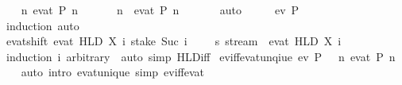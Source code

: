 \begin{isabellebody}
\isamarkupfalse%
\isanewline
\ \ \isamarkupfalse%
\ {\isachardoublequoteopen}{\isasymexists}n{\isachardot}\ ev{\isacharunderscore}at\ P\ n\ {\isasymomega}{\isachardoublequoteclose}\isanewline
\ \ \isamarkupfalse%
\ \isamarkupfalse%
\ n\ \ {\isachardoublequoteopen}ev{\isacharunderscore}at\ P\ n\ {\isasymomega}{\isachardoublequoteclose}\isanewline
\ \ \ \ \isamarkupfalse%
\ auto\isanewline
\ \ \isamarkupfalse%
\ \isamarkupfalse%
\ {\isachardoublequoteopen}ev\ P\ {\isasymomega}{\isachardoublequoteclose}\isanewline
\ \ \ \ \isamarkupfalse%
\ induction\ auto\isanewline
{}\isamarkupfalse%
%
\endisatagproof
{\isafoldproof}%
%
\isadelimproof
\isanewline
%
\endisadelimproof
\isanewline
{}\isamarkupfalse%
\ ev{\isacharunderscore}at{\isacharunderscore}shift{\isacharcolon}\ {\isachardoublequoteopen}ev{\isacharunderscore}at\ {\isacharparenleft}HLD\ X{\isacharparenright}\ i\ {\isacharparenleft}stake\ {\isacharparenleft}Suc\ i{\isacharparenright}\ {\isasymomega}\ {\isacharat}{\isacharminus}\ {\isasymomega}{\isacharprime}\ {\isacharcolon}{\isacharcolon}\ {\isacharprime}s\ stream{\isacharparenright}\ {\isasymlongleftrightarrow}\ ev{\isacharunderscore}at\ {\isacharparenleft}HLD\ X{\isacharparenright}\ i\ {\isasymomega}{\isachardoublequoteclose}\isanewline
%
\isadelimproof
\ \ %
\endisadelimproof
%
\isatagproof
{}\isamarkupfalse%
\ {\isacharparenleft}induction\ i\ arbitrary{\isacharcolon}\ {\isasymomega}{\isacharparenright}\ {\isacharparenleft}auto\ simp{\isacharcolon}\ HLD{\isacharunderscore}iff{\isacharparenright}%
\endisatagproof
{\isafoldproof}%
%
\isadelimproof
\isanewline
%
\endisadelimproof
\isanewline
{}\isamarkupfalse%
\ ev{\isacharunderscore}iff{\isacharunderscore}ev{\isacharunderscore}at{\isacharunderscore}unqiue{\isacharcolon}\ {\isachardoublequoteopen}ev\ P\ {\isasymomega}\ {\isasymlongleftrightarrow}\ {\isacharparenleft}{\isasymexists}{\isacharbang}n{\isachardot}\ ev{\isacharunderscore}at\ P\ n\ {\isasymomega}{\isacharparenright}{\isachardoublequoteclose}\isanewline
%
\isadelimproof
\ \ %
\endisadelimproof
%
\isatagproof
{}\isamarkupfalse%
\ {\isacharparenleft}auto\ intro{\isacharcolon}\ ev{\isacharunderscore}at{\isacharunderscore}unique\ simp{\isacharcolon}\ ev{\isacharunderscore}iff{\isacharunderscore}ev{\isacharunderscore}at{\isacharparenright}%
\endisatagproof
{\isafoldproof}%
%
\isadelimproof
\isanewline
%
\endisadelimproof
\isanewline

\end{isabellebody}
